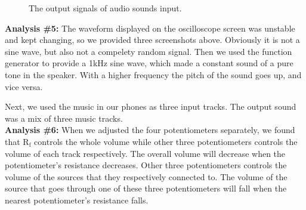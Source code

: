 \begin{figure}[!htbp]
\begin{framed}
		\caption{The output signals of audio sounds input.}
		\label{fig:pre11} 
	\end{framed}
\end{figure}

\textbf{Analysis \#5:} \newline
\phantom{ } The waveform displayed on the oscilloscope screen was unstable and kept changing, so we provided three screenshots above. Obviously it is not a sine wave, but also not a compelety random signal. Then we used the function generator to provide a 1kHz sine wave, which made a constant sound of a pure tone in the speaker. With a higher frequency the pitch of the sound goes up, and vice versa.

\phantom{ } Next, we used the music in our phones as three input tracks. The output sound was a mix of three music tracks.\\

\textbf{Analysis \#6:} \newline
\phantom{ } When we adjusted the four potentiometers separately, we found that $ \mathrm{R_f} $ controls the whole volume while other three potentiometers controls the volume of each track respectively. The overall volume will decrease when the potentiometer's resistance decreases. Other three potentiometers controls the volume of the sources that they respectively connected to. The volume of the source that goes through one of these three potentiometers will fall when the nearest potentiometer's resistance falls. 